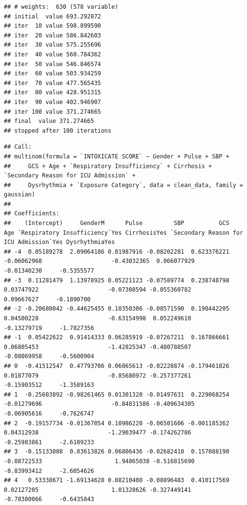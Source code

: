 \documentclass[
]{article}
\begin{document}
\begin{verbatim}
## # weights:  630 (578 variable)
## initial  value 693.292872 
## iter  10 value 598.899590
## iter  20 value 586.842603
## iter  30 value 575.255696
## iter  40 value 560.784362
## iter  50 value 546.846574
## iter  60 value 503.934259
## iter  70 value 477.565435
## iter  80 value 428.951315
## iter  90 value 402.946907
## iter 100 value 371.274665
## final  value 371.274665 
## stopped after 100 iterations
\end{verbatim}

\begin{verbatim}
## Call:
## multinom(formula = `INTOXICATE SCORE` ~ Gender + Pulse + SBP + 
##     GCS + Age + `Respiratory Insufficiency` + Cirrhosis + `Secondary Reason for ICU Admission` + 
##     Dysrhythmia + `Exposure Category`, data = clean_data, family = gaussian)
## 
## Coefficients:
##    (Intercept)     GenderM      Pulse         SBP          GCS         Age `Respiratory Insufficiency`Yes CirrhosisYes `Secondary Reason for ICU Admission`Yes DysrhythmiaYes
## -4  0.05189278  2.09064186 0.01987916 -0.08202281  0.623376221 -0.06062968                    -0.43032365  0.066077929                             -0.01340230     -0.5355577
## -3  0.11281479  1.13978925 0.05221123 -0.07589774  0.238748798  0.03747922                    -0.07308594 -0.055360782                              0.09667627     -0.1890700
## -2 -0.20680042 -0.44625455 0.10350306 -0.08571590  0.190442205  0.04500228                    -0.63154998  0.052249610                             -0.13279719     -1.7827356
## -1  0.05422622  0.91414333 0.06285919 -0.07267211  0.167866661  0.06805453                    -1.42825347 -0.480788507                             -0.08069958     -0.5600904
## 0  -0.41512547  0.47793706 0.06865613 -0.02228874 -0.179461826  0.01877079                    -0.85680972 -0.257377261                             -0.15903512     -1.3589163
## 1  -0.25603892 -0.98261465 0.01301320 -0.01497631  0.229068254 -0.01279696                    -0.84831586 -0.409634305                             -0.06905616     -0.7626747
## 2  -0.19157734 -0.01367054 0.10986220 -0.06501606 -0.001185362  0.04312938                    -1.29039477 -0.174262786                             -0.25983861     -2.6109233
## 3  -0.15133008  0.03613826 0.06806436 -0.02682410  0.157088190 -0.08722533                     1.94865038 -0.516815690                             -0.83993412     -2.6054626
## 4   0.53338671 -1.69134628 0.08210408 -0.08896483  0.410117569  0.02127205                     1.01328626 -0.327449141                             -0.78380066     -0.6435843

\end{verbatim}
\end{document}

